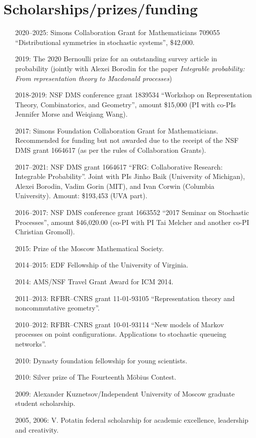 \documentclass[letterpaper,11pt]{article}
\begin{document}
\section*{Scholarships/prizes/funding}
\begin{itemize}
	\item [2020--2025:]
		Simons Collaboration Grant for Mathematicians 709055
		``Distributional symmetries in stochastic systems'',
		\$42,000.
	\item [2019:] 
		The 2020 Bernoulli prize for an outstanding survey article in probability 
		(jointly with Alexei Borodin for the paper \emph{Integrable probability: From representation theory to
		Macdonald processes})
	\item 
				[2018-2019:]
				NSF DMS conference grant 
				1839534
				``Workshop on Representation Theory, Combinatorics, and Geometry'',
				amount \$15,000
				(PI with co-PIs Jennifer Morse and Weiqiang Wang).
	\item
	      [2017:] Simons Foundation Collaboration Grant for
	      Mathematicians. Recommended for funding but not awarded due to
	      the receipt of the NSF DMS grant 1664617 (as per the rules of Collaboration
	      Grants).
	\item
	      [2017--2021:] NSF DMS grant 1664617
	      ``FRG: Collaborative Research: Integrable Probability''.
	      Joint with PIs Jinho Baik (University of Michigan), Alexei
	      Borodin, Vadim Gorin (MIT), and Ivan Corwin (Columbia University). Amount:
	      \$193,453 (UVA part).
	\item
	      [2016--2017:]
	      NSF DMS conference grant 1663552 ``2017 Seminar on Stochastic
	      Processes'', amount \$46,020.00 (co-PI with PI Tai Melcher and another co-PI
	      Christian Gromoll).
	\item
	      [2015:] Prize of the Moscow Mathematical Society.
	\item
	      [2014--2015:] EDF Fellowship of the University of Virginia.
	\item
	      [2014:] AMS/NSF Travel Grant Award for ICM 2014.
	\item
	      [2011--2013:] RFBR--CNRS grant 11-01-93105 ``Representation
	      theory and noncommutative geometry''.
	\item
	      [2010--2012:] RFBR--CNRS grant 10-01-93114 ``New models of
	      Markov processes on point configurations. Applications to
	      stochastic queueing networks''.
	\item
	      [2010:] Dynasty foundation fellowship for young scientists.
	\item
	      [2010:] Silver prize of The Fourteenth M\"obius Contest.
	\item
	      [2009:] Alexander Kuznetsov/Independent University of Moscow
	      graduate student scholarship.
	\item
	      [2005, 2006:] V. Potatin federal scholarship for academic
	      excellence, leadership and creativity.
\end{itemize}
\end{document}
